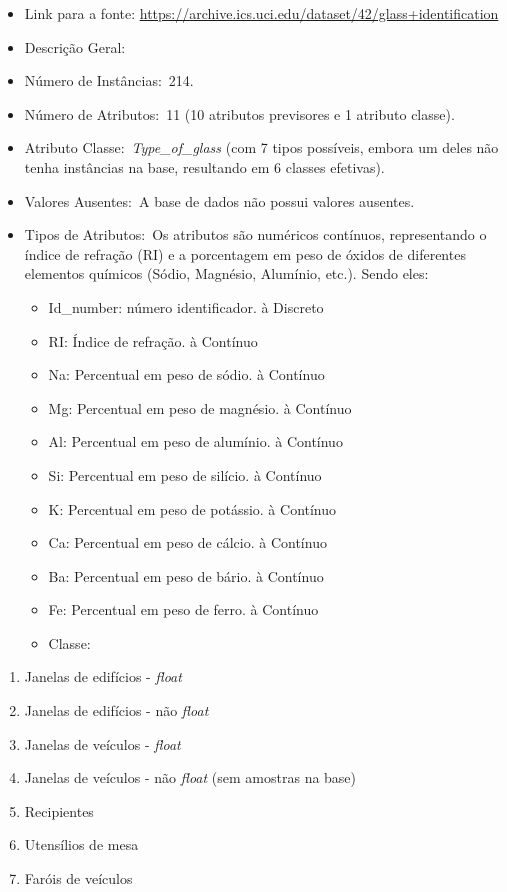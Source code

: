 \documentclass[
  letterpaper,
  DIV=11,
  numbers=noendperiod]{scrartcl}
\begin{document}
\begin{itemize}
\item
  Link para a fonte:
  \url{https://archive.ics.uci.edu/dataset/42/glass+identification}
\item
  Descrição Geral:
\item
  Número de Instâncias:~214.
\item
  Número de Atributos:~11 (10 atributos previsores e 1 atributo classe).
\item
  Atributo Classe:~\emph{Type\_of\_glass} (com 7 tipos possíveis, embora
  um deles não tenha instâncias na base, resultando em 6 classes
  efetivas).
\item
  Valores Ausentes:~A base de dados não possui valores ausentes.
\item
  Tipos de Atributos:~Os atributos são numéricos contínuos,
  representando o índice de refração (RI) e a porcentagem em peso de
  óxidos de diferentes elementos químicos (Sódio, Magnésio, Alumínio,
  etc.). Sendo eles:

  \begin{itemize}
  \item
    Id\_number: número identificador. à Discreto
  \item
    RI: Índice de refração. à Contínuo
  \item
    Na: Percentual em peso de sódio. à Contínuo
  \item
    Mg: Percentual em peso de magnésio. à Contínuo
  \item
    Al: Percentual em peso de alumínio. à Contínuo
  \item
    Si: Percentual em peso de silício. à Contínuo
  \item
    K: Percentual em peso de potássio. à Contínuo
  \item
    Ca: Percentual em peso de cálcio. à Contínuo
  \item
    Ba: Percentual em peso de bário. à Contínuo
  \item
    Fe: Percentual em peso de ferro. à Contínuo
  \item
    Classe:
  \end{itemize}
\end{itemize}

\begin{enumerate}
\def\labelenumi{\arabic{enumi}.}
\item
  Janelas de edifícios - \emph{float}
\item
  Janelas de edifícios - não \emph{float}
\item
  Janelas de veículos - \emph{float}
\item
  Janelas de veículos - não \emph{float} (sem amostras na base)
\item
  Recipientes
\item
  Utensílios de mesa
\item
  Faróis de veículos
\end{enumerate}
\end{document}
